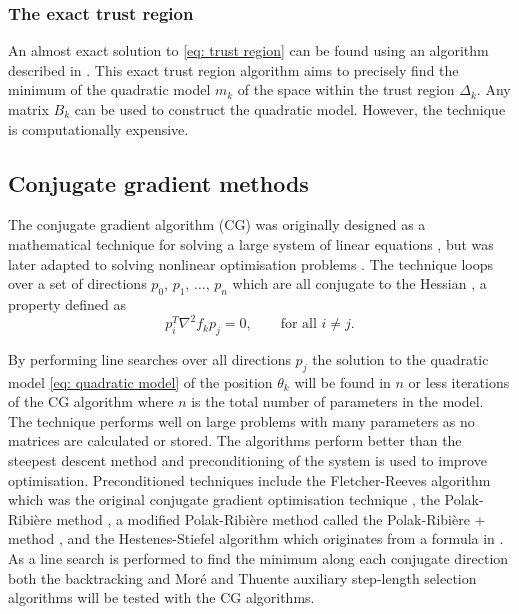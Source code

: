 \subsubsection{The exact trust region}

An almost exact solution to \eqref{eq: trust region} can be found using an algorithm described in \citet{NocedalWright99}.
This exact trust region algorithm aims to precisely find the minimum of the quadratic model $m_k$ of the space within the trust region $\Delta_k$.
Any matrix $B_k$ can be used to construct the quadratic model.
However, the technique is computationally expensive.




\subsection{Conjugate gradient methods}

The conjugate gradient algorithm (CG) was originally designed as a mathematical technique for solving a large system of linear equations \citet{HestenesStiefel52}, but was later adapted to solving nonlinear optimisation problems \citep{FletcherReeves64}.
The technique loops over a set of directions $p_0$, $p_1$, $\hdots$, $p_n$ which are all conjugate to the Hessian \citep{NocedalWright99}, a property defined as
\begin{equation}
 p_i^T \nabla^2 f_k p_j = 0,  \qquad \textrm{for all } i \ne j.
\end{equation}

\noindent By performing line searches over all directions $p_j$ the solution to the quadratic model \eqref{eq: quadratic model} of the position $\theta_k$ will be found in $n$ or less iterations of the CG algorithm where $n$ is the total number of parameters in the model.
The technique performs well on large problems with many parameters as no matrices are calculated or stored.
The algorithms perform better than the steepest descent method and preconditioning of the system is used to improve optimisation.
Preconditioned techniques include the Fletcher-Reeves algorithm which was the original conjugate gradient optimisation technique \citep{FletcherReeves64}, the Polak-Ribi\`ere method \citep{PolakRibiere69}, a modified Polak-Ribi\`ere method called the Polak-Ribi\`ere + method \citep{NocedalWright99}, and the Hestenes-Stiefel algorithm which originates from a formula in \citet{HestenesStiefel52}.
As a line search is performed to find the minimum along each conjugate direction both the backtracking and Mor\'e and Thuente auxiliary step-length selection algorithms will be tested with the CG algorithms.



